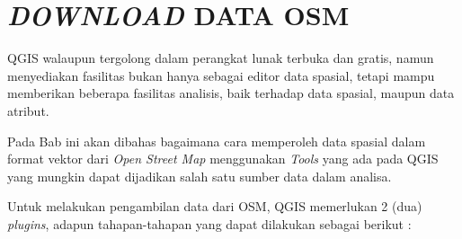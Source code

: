 \chapter{\textit{DOWNLOAD} DATA OSM}

QGIS walaupun tergolong dalam perangkat lunak terbuka dan gratis, namun menyediakan fasilitas bukan hanya sebagai editor data spasial, tetapi mampu memberikan beberapa fasilitas analisis, baik terhadap data spasial, maupun data atribut.

Pada Bab ini akan dibahas bagaimana cara memperoleh data spasial dalam format vektor dari \textit{Open Street Map} menggunakan \textit{Tools} yang ada pada QGIS yang mungkin dapat dijadikan salah satu sumber data dalam analisa.

Untuk melakukan pengambilan data dari OSM, QGIS memerlukan 2 (dua) \textit{plugins}, adapun tahapan-tahapan yang dapat dilakukan sebagai berikut :

